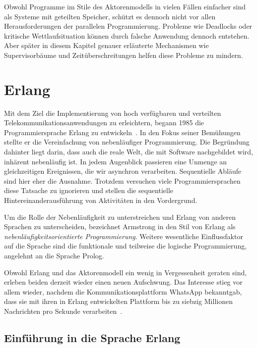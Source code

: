 Obwohl Programme im Stile des Aktorenmodells in vielen Fällen einfacher sind als Systeme mit geteilten Speicher, schützt es dennoch nicht vor allen Herausforderungen der parallelen Programmierung. Probleme wie Deadlocks oder kritische Wettlaufsituation können durch falsche Anwendung dennoch entstehen. Aber später in diesem Kapitel genauer erläuterte Mechanismen wie Supervisorbäume und Zeitüberschreitungen helfen diese Probleme zu mindern.

\section{Erlang}
\label{sec:erlang}

Mit dem Ziel die Implementierung von hoch verfügbaren und verteilten Telekommunikationsanwendungen zu erleichtern, begann \citeauthor{Armstrong:1997:DE:258948.258967} 1985 die  Programmiersprache Erlang zu entwickeln~\cite{Armstrong:1997:DE:258948.258967}. In den Fokus seiner Bemühungen stellte er die Vereinfachung von nebenläufiger Programmierung. Die Begründung dahinter liegt darin, dass auch die reale Welt, die mit Software nachgebildet wird, inhärent nebenläufig ist. In jedem Augenblick passieren eine Unmenge an gleichzeitigen Ereignissen, die wir asynchron verarbeiten. Sequentielle Abläufe sind hier eher die Ausnahme. Trotzdem versuchen viele Programmiersprachen diese Tatsache zu ignorieren und stellen die sequentielle Hintereinanderausführung von Aktivitäten in den Vordergrund.

Um die Rolle der Nebenläufigkeit zu unterstreichen und Erlang von anderen Sprachen zu unterscheiden, bezeichnet Armstrong in \cite[19]{armstrong03} den Stil von Erlang als \textit{nebenläufigkeitsorientierte Programmierung}. Weitere wesentliche Einflussfaktor auf die Sprache sind die funktionale und teilweise die logische Programmierung, angelehnt an die Sprache Prolog.

Obwohl Erlang und das Aktorenmodell ein wenig in Vergessenheit geraten sind, erleben beiden derzeit wieder einen neuen Aufschwung. Das Interesse stieg vor allem wieder, nachdem die Kommunikationsplattform WhatsApp bekanntgab, dass sie mit ihren in Erlang entwickelten Plattform bis zu siebzig Millionen Nachrichten pro Sekunde verarbeiten~\cite{ErlangWhatsApp}.

\subsection{Einführung in die Sprache Erlang}

